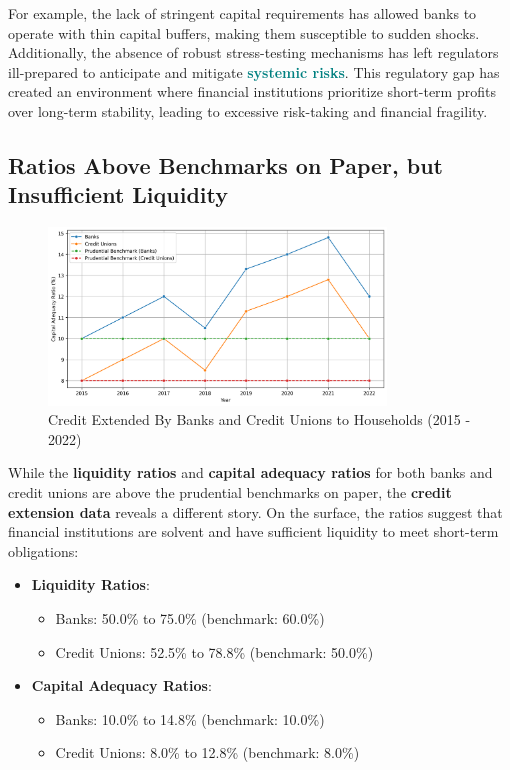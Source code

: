 For example, the lack of stringent capital requirements has allowed banks to operate with thin capital buffers, making them susceptible to sudden shocks. Additionally, the absence of robust stress-testing mechanisms has left regulators ill-prepared to anticipate and mitigate \textcolor{teal}{\textbf{systemic risks}}. This regulatory gap has created an environment where financial institutions prioritize short-term profits over long-term stability, leading to excessive risk-taking and financial fragility.

\newpage

\subsection*{Ratios Above Benchmarks on Paper, but Insufficient Liquidity}

\begin{figure}[h]
    \centering
    \includegraphics[width=0.8\textwidth]{Benchmarks.png}
    \caption{Credit Extended By Banks and Credit Unions to Households (2015 - 2022)}
    \label{fig:graph_1}
\end{figure}

While the \textbf{liquidity ratios} and \textbf{capital adequacy ratios} for both banks and credit unions are above the prudential benchmarks on paper, the \textbf{credit extension data} reveals a different story. On the surface, the ratios suggest that financial institutions are solvent and have sufficient liquidity to meet short-term obligations:
\begin{itemize}
    \item \textbf{Liquidity Ratios}:
        \begin{itemize}
            \item Banks: 50.0\% to 75.0\% (benchmark: 60.0\%)
            \item Credit Unions: 52.5\% to 78.8\% (benchmark: 50.0\%)
        \end{itemize}
    \item \textbf{Capital Adequacy Ratios}:
        \begin{itemize}
            \item Banks: 10.0\% to 14.8\% (benchmark: 10.0\%)
            \item Credit Unions: 8.0\% to 12.8\% (benchmark: 8.0\%)
        \end{itemize}
\end{itemize}

